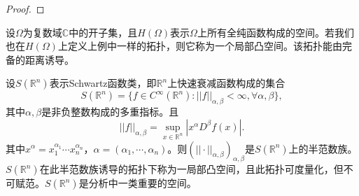 \begin{proof}
	
\end{proof}

\begin{example}
	设$\Omega$为复数域$\mathbb{C}$中的开子集，且$H(\Omega)$表示$\Omega$上所有全纯函数构成的空间。若我们也在$H(\Omega)$上定义上例中一样的拓扑，则它称为一个局部凸空间。该拓扑能由完备的距离诱导。
\end{example}

\begin{example}
	设$S(\mathbb{R}^{n})$表示Schwartz函数类，即$\mathbb{R}^{n}$上快速衰减函数构成的集合
	\begin{equation*}
		S(\mathbb{R}^{n})=\{f\in C^{\infty}(\mathbb{R}^{n}):||f||_{\alpha,\beta}<\infty,\forall \alpha,\beta\},
	\end{equation*}
	其中$\alpha,\beta$是非负整数构成的多重指标。且
	\begin{equation*}
		||f||_{\alpha,\beta}=\sup_{x\in \mathbb{R}^{n}}\left|x^{\alpha}D^{\beta}f(x)\right|.
	\end{equation*}
	其中$x^{\alpha}=x_{1}^{\alpha_{1}}\cdots x_{n}^{\alpha_{n}} $，$\alpha=(\alpha_{1},\cdots,\alpha_{n}) $。则$(||\cdot||_{\alpha,\beta})_{\alpha,\beta} $是$S(\mathbb{R}^{n})$上的半范数族。$S(\mathbb{R}^{n})$在此半范数族诱导的拓扑下称为一局部凸空间，且此拓扑可度量化，但不可赋范。$S(\mathbb{R}^{n})$是分析中一类重要的空间。
\end{example}


























